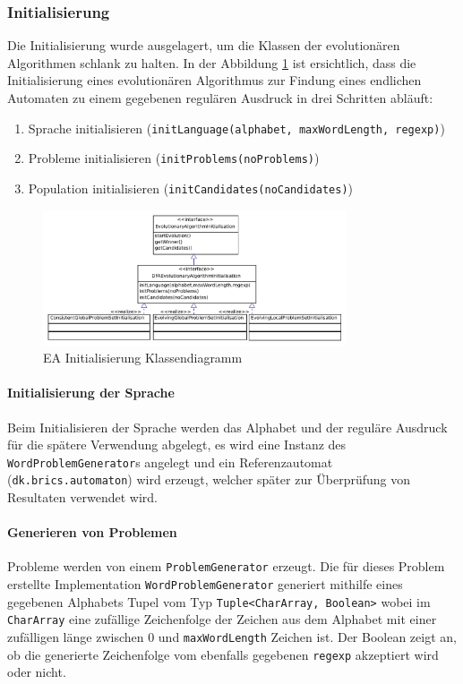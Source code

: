 \subsubsection{Initialisierung}
Die Initialisierung wurde ausgelagert, um die Klassen der evolutionären Algorithmen schlank zu halten. In der Abbildung \ref{fig:ea_init_classdiag_simple} ist ersichtlich, dass die Initialisierung eines evolutionären Algorithmus zur Findung eines endlichen Automaten zu einem gegebenen regulären Ausdruck in drei Schritten abläuft:
\begin{enumerate}
	\item Sprache initialisieren (\lstinline$initLanguage(alphabet, maxWordLength, regexp)$)
	\item Probleme initialisieren (\lstinline$initProblems(noProblems)$)
	\item Population initialisieren (\lstinline$initCandidates(noCandidates)$)
\end{enumerate}

\begin{figure}[h]
  \centering
  \includegraphics[width=0.8\textwidth]{images/simple_uml_evolution_initialisation.pdf}
  \caption[EA Initialisierung Klassendiagramm]{EA Initialisierung Klassendiagramm}
  \label{fig:ea_init_classdiag_simple}
\end{figure}

\paragraph{Initialisierung der Sprache}
Beim Initialisieren der Sprache werden das Alphabet und der reguläre Ausdruck für die spätere Verwendung abgelegt, es wird eine Instanz des \lstinline$WordProblemGenerator$s angelegt und ein Referenzautomat (\lstinline$dk.brics.automaton$) wird erzeugt, welcher später zur Überprüfung von Resultaten verwendet wird.

\paragraph{Generieren von Problemen}
Probleme werden von einem \lstinline$ProblemGenerator$ erzeugt. Die für dieses Problem erstellte Implementation \lstinline$WordProblemGenerator$ generiert mithilfe eines gegebenen Alphabets Tupel vom Typ \lstinline$Tuple<CharArray, Boolean>$ wobei im \lstinline$CharArray$ eine zufällige Zeichenfolge der Zeichen aus dem Alphabet mit einer zufälligen länge zwischen 0 und \lstinline$maxWordLength$ Zeichen ist. Der Boolean zeigt an, ob die generierte Zeichenfolge vom ebenfalls gegebenen \lstinline$regexp$ akzeptiert wird oder nicht.

